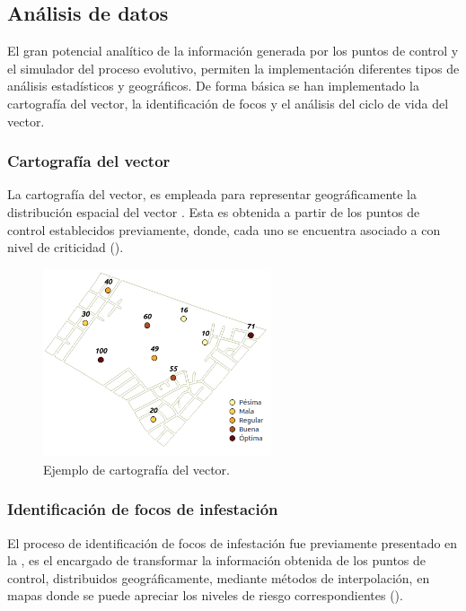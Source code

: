\subsection{Análisis de datos}
El gran potencial analítico de la información generada por los puntos de control y el simulador
del proceso evolutivo, permiten la implementación diferentes tipos de análisis estadísticos y
geográficos. De forma básica se han implementado la cartografía del vector, la identificación de
focos y el análisis del ciclo de vida del vector.

\subsubsection{Cartografía del vector}
La cartografía del vector, es empleada para representar geográficamente la distribución espacial
del vector \citep{vgomesAegis2001}. Esta es obtenida a partir de los puntos de control establecidos
previamente, donde, cada uno se encuentra asociado a con nivel de criticidad
().


\begin{figure}[!htpb]
\centering
\includegraphics[width=0.6\textwidth]{capitulo-5/graphics/cartografia-vector.png}
\caption{\label{fig:cap-5-cartografica-vector}Ejemplo de cartografía del vector.}
\end{figure}

\subsubsection{Identificación de focos de infestación}
\label{sec:cap5-identificacion-focos}
El proceso de identificación de focos de infestación fue previamente presentado en la
, es el encargado de transformar la información obtenida de
los puntos de control, distribuidos geográficamente, mediante métodos de interpolación, en mapas
donde se puede apreciar los niveles de riesgo correspondientes
().

